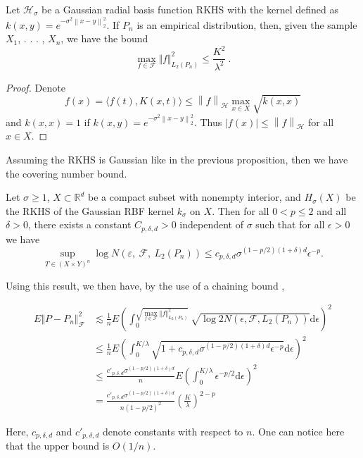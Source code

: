 	\begin{prop}
		Let $\mathcal{H}_{\sigma}$ be a Gaussian radial basis function RKHS with the kernel defined as $k(x,y)=e^{-\sigma^2 \left\|x-y\right\|_2^2}$. If $P_{n}$ is an empirical distribution, then, given the sample $X_{1}$, . . . , $X_{n}$, we have the bound
		$$
		\max_{f\in \mathcal{F}} \Vert f\Vert_{L_{2}(P_{n})}^{2}\leq \frac{K^2}{\lambda^2}\ .
		$$ 
	\end{prop}
	
	\begin{proof}
		Denote $$f(x)=\langle f(t),K(x,t)\rangle \leq \left\|f\right\|_{\mathcal{H}}\max_{x\in X} \sqrt{k(x,x)}$$ and $k(x,x)=1$ if $k(x,y)=e^{-\sigma^2 \left\|x-y\right\|_2^2}$. Thus $\left|f(x)\right|\leq \left\|f\right\|_{\mathcal{H}}$ for all $x\in X$.
	\end{proof}
	
	Assuming the RKHS is Gaussian like in the previous proposition, then we have the covering number bound.
	\begin{theorem} \cite{Steinwart2007}
		Let $\sigma\geq 1$, $X\subset \mathbb{R}^d$ be a compact subset with nonempty interior, and $H_{\sigma}(X)$ be the RKHS of the Gaussian RBF kernel $k_{\sigma}$ on $X$. Then for all $0<p\leq 2$ and all $\delta>0$, there exists a constant $C_{p,\delta,d}>0$ independent of $\sigma$ such that for all $\epsilon>0$ we have 
		$$
		\sup_{T\in (X\times Y)^n} \log N(\varepsilon,\ \mathcal{F},\ L_{2}(P_{n}))\leq c_{p,\delta,d} \sigma^{(1-p/2)(1+\delta)d}\epsilon^{-p}.
		$$
	\end{theorem}
	
	Using this result, we then have, by the use of a chaining bound \cite{Gine2016},
	
	\begin{align*}
		E \displaystyle\Vert P-P_n\Vert_{\mathcal{F}}^{2}&\lesssim \frac{1}{n}E(\int_{0}^{\sqrt{\max_{f\in \mathcal{F}}\Vert f\Vert_{L_{2}(P_{n})}^{2}}}\sqrt{\log 2N(\epsilon,\mathcal{F},L_{2}(P_{n}))}\mathrm{d}\epsilon)^{2} \\
		&\leq \frac{1}{n}E(\int_{0}^{K/\lambda}\sqrt{1+c_{p,\delta,d} \sigma^{(1-p/2)(1+\delta)d}\epsilon^{-p}}\mathrm{d}\epsilon)^{2} \\
		&\leq \frac{c'_{p,\delta,d} \sigma^{(1-p/2)(1+\delta)d}}{n}E(\int_{0}^{K/\lambda} \epsilon^{-p/2} \mathrm{d}\epsilon)^{2} \\
		&= \frac{c'_{p,\delta,d} \sigma^{(1-p/2)(1+\delta)d}}{n(1-p/2)^2} \left(\frac{K}{\lambda}\right)^{2-p}
	\end{align*}
	
	Here, $c_{p,\delta,d}$ and $c'_{p,\delta,d}$ denote constants with respect to $n$. One can notice here that the upper bound is $O(1/n)$.
